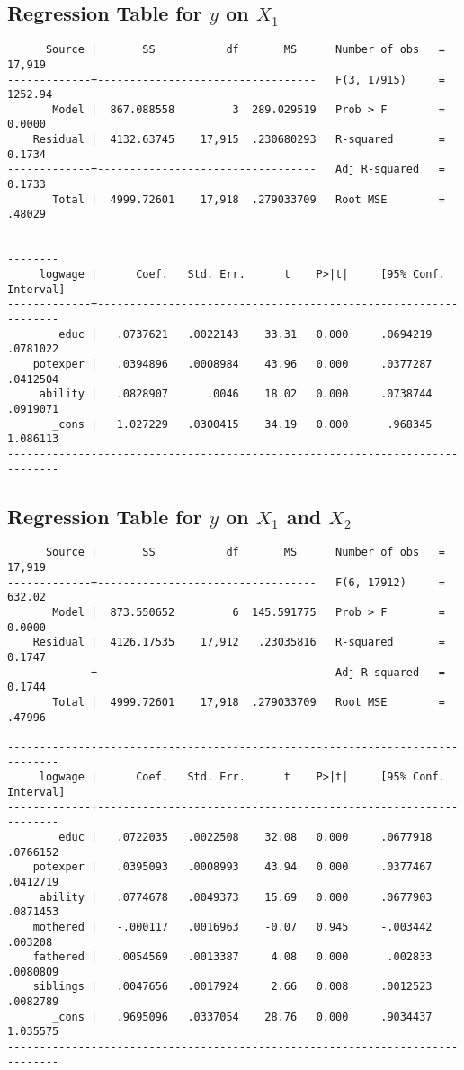 \documentclass{article}
\begin{document}
\hypertarget{yonx1}{\subsection*{Regression Table for $y$ on $X_1$}}
\begin{verbatim}
      Source |       SS           df       MS      Number of obs   =    17,919
-------------+----------------------------------   F(3, 17915)     =   1252.94
       Model |  867.088558         3  289.029519   Prob > F        =    0.0000
    Residual |  4132.63745    17,915  .230680293   R-squared       =    0.1734
-------------+----------------------------------   Adj R-squared   =    0.1733
       Total |  4999.72601    17,918  .279033709   Root MSE        =    .48029

------------------------------------------------------------------------------
     logwage |      Coef.   Std. Err.      t    P>|t|     [95% Conf. Interval]
-------------+----------------------------------------------------------------
        educ |   .0737621   .0022143    33.31   0.000     .0694219    .0781022
    potexper |   .0394896   .0008984    43.96   0.000     .0377287    .0412504
     ability |   .0828907      .0046    18.02   0.000     .0738744    .0919071
       _cons |   1.027229   .0300415    34.19   0.000      .968345    1.086113
------------------------------------------------------------------------------	
\end{verbatim}


\hypertarget{yonx1x2}{\subsection*{Regression Table for $y$ on $X_1$ and $X_2$}}
\label{sec: table2}
\begin{verbatim}
      Source |       SS           df       MS      Number of obs   =    17,919
-------------+----------------------------------   F(6, 17912)     =    632.02
       Model |  873.550652         6  145.591775   Prob > F        =    0.0000
    Residual |  4126.17535    17,912   .23035816   R-squared       =    0.1747
-------------+----------------------------------   Adj R-squared   =    0.1744
       Total |  4999.72601    17,918  .279033709   Root MSE        =    .47996

------------------------------------------------------------------------------
     logwage |      Coef.   Std. Err.      t    P>|t|     [95% Conf. Interval]
-------------+----------------------------------------------------------------
        educ |   .0722035   .0022508    32.08   0.000     .0677918    .0766152
    potexper |   .0395093   .0008993    43.94   0.000     .0377467    .0412719
     ability |   .0774678   .0049373    15.69   0.000     .0677903    .0871453
    mothered |   -.000117   .0016963    -0.07   0.945     -.003442     .003208
    fathered |   .0054569   .0013387     4.08   0.000      .002833    .0080809
    siblings |   .0047656   .0017924     2.66   0.008     .0012523    .0082789
       _cons |   .9695096   .0337054    28.76   0.000     .9034437    1.035575
------------------------------------------------------------------------------

\end{verbatim}
\end{document}
